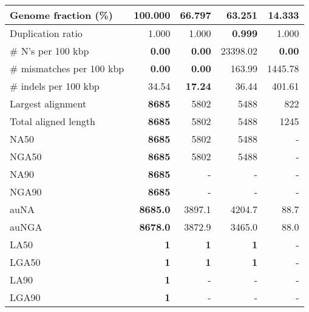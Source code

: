 \documentclass[12pt,a4paper]{article}
\begin{document}
\begin{table}[ht]
\begin{center}
\begin{tabular}{|l*{4}{|r}|}
Genome fraction (\%) & {\bf 100.000} & 66.797 & 63.251 & 14.333 \\ \hline
Duplication ratio & 1.000 & 1.000 & {\bf 0.999} & 1.000 \\ \hline
\# N's per 100 kbp & {\bf 0.00} & {\bf 0.00} & 23398.02 & {\bf 0.00} \\ \hline
\# mismatches per 100 kbp & {\bf 0.00} & {\bf 0.00} & 163.99 & 1445.78 \\ \hline
\# indels per 100 kbp & 34.54 & {\bf 17.24} & 36.44 & 401.61 \\ \hline
Largest alignment & {\bf 8685} & 5802 & 5488 & 822 \\ \hline
Total aligned length & {\bf 8685} & 5802 & 5488 & 1245 \\ \hline
NA50 & {\bf 8685} & 5802 & 5488 & - \\ \hline
NGA50 & {\bf 8685} & 5802 & 5488 & - \\ \hline
NA90 & {\bf 8685} & - & - & - \\ \hline
NGA90 & {\bf 8685} & - & - & - \\ \hline
auNA & {\bf 8685.0} & 3897.1 & 4204.7 & 88.7 \\ \hline
auNGA & {\bf 8678.0} & 3872.9 & 3465.0 & 88.0 \\ \hline
LA50 & {\bf 1} & {\bf 1} & {\bf 1} & - \\ \hline
LGA50 & {\bf 1} & {\bf 1} & {\bf 1} & - \\ \hline
LA90 & {\bf 1} & - & - & - \\ \hline
LGA90 & {\bf 1} & - & - & - \\ \hline
\end{tabular}
\end{center}
\end{table}
\end{document}
